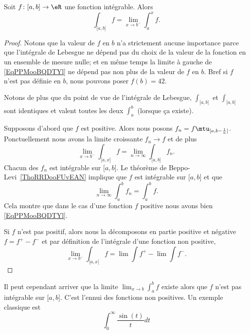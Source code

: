 \begin{proposition}     \label{PropCJAooQhNYkp}
	Soit \( f\colon \mathopen[ a , b \mathclose]\to \eR\) une fonction intégrable. Alors
	\begin{equation}    \label{EqPPMooBQDTYl}
		\int_{\mathopen[ a , b \mathclose]}f=\lim_{x\to b^-} \int_a^xf.
	\end{equation}
\end{proposition}

\begin{proof}
	Notons que la valeur de \( f\) en \( b\) n'a strictement aucune importance parce que l'intégrale de Lebesgue ne dépend pas du choix de la valeur de la fonction en un ensemble de mesure nulle; et en même temps la limite à gauche de \eqref{EqPPMooBQDTYl} ne dépend pas non plus de la valeur de \( f\) en \( b\). Bref si \( f\) n'est pas définie en \( b\), nous pouvons poser \( f(b)=42\).

	Notons de plus que du point de vue de l'intégrale de Lebesgue, \( \int_{\mathopen[ a , b \mathclose]}\) et \( \int_{\mathopen[ a , b [}\) sont identiques et valent toutes les deux \( \int_a^b\) (lorsque ça existe).

	Supposons d'abord que \( f\) est positive. Alors nous posons \( f_n=f\mtu_{\mathopen[ a , b-\frac{1}{ n } \mathclose]}\). Ponctuellement nous avons la limite croissante \( f_n\to f\) et de plus
	\begin{equation}
		\lim_{x\to b^-} \int_{\mathopen[ a , x \mathclose]}f=\lim_{n\to \infty} \int_{\mathopen[ a , b \mathclose]}f_n.
	\end{equation}
	Chacun des \( f_n\) est intégrable sur \( \mathopen[ a , b \mathclose]\). Le théorème de Beppo-Levi~\ref{ThoRRDooFUvEAN} implique que \( f\) est intégrable sur \( \mathopen[ a , b \mathclose]\) et que
	\begin{equation}
		\lim_{n\to \infty} \int_a^bf_n=\int_a^bf.
	\end{equation}
	Cela montre que dans le cas d'une fonction \( f\) positive nous avons bien \eqref{EqPPMooBQDTYl}.

	Si \( f\) n'est pas positif, alors nous la décomposons en partie positive et négative \( f=f^+-f^{-}\) et par définition de l'intégrale d'une fonction non positive,
	\begin{equation}
		\lim_{x\to b^-} \int_{\mathopen[ a , x [}f=\lim\int f^{+}-\lim\int f^-.
	\end{equation}
\end{proof}

Il peut cependant arriver que la limite \( \lim_{x\to b} \int_a^bf\) existe alors que \( f\) n'est pas intégrable sur \( \mathopen[ a , b \mathclose]\). C'est l'ennui des fonctions non positives. Un exemple classique est
\begin{equation}\label{EqMMVooDSpgfz}
	\int_0^{\infty}\frac{ \sin(t) }{ t }dt
\end{equation}

